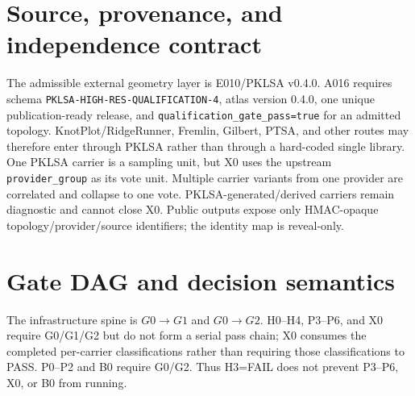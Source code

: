 \documentclass[11pt,a4paper]{article}
\begin{document}
\section{Source, provenance, and independence contract}
The admissible external geometry layer is E010/PKLSA v0.4.0. A016 requires schema \texttt{PKLSA-HIGH-RES-QUALIFICATION-4}, atlas version 0.4.0, one unique publication-ready release, and \texttt{qualification\_gate\_pass=true} for an admitted topology. KnotPlot/RidgeRunner, Fremlin, Gilbert, PTSA, and other routes may therefore enter through PKLSA rather than through a hard-coded single library. One PKLSA carrier is a sampling unit, but X0 uses the upstream \texttt{provider\_group} as its vote unit. Multiple carrier variants from one provider are correlated and collapse to one vote. PKLSA-generated/derived carriers remain diagnostic and cannot close X0. Public outputs expose only HMAC-opaque topology/provider/source identifiers; the identity map is reveal-only.

\section{Gate DAG and decision semantics}
The infrastructure spine is $G0\rightarrow G1$ and $G0\rightarrow G2$. H0--H4, P3--P6, and X0 require G0/G1/G2 but do not form a serial pass chain; X0 consumes the completed per-carrier classifications rather than requiring those classifications to PASS. P0--P2 and B0 require G0/G2. Thus H3=FAIL does not prevent P3--P6, X0, or B0 from running.
\end{document}
